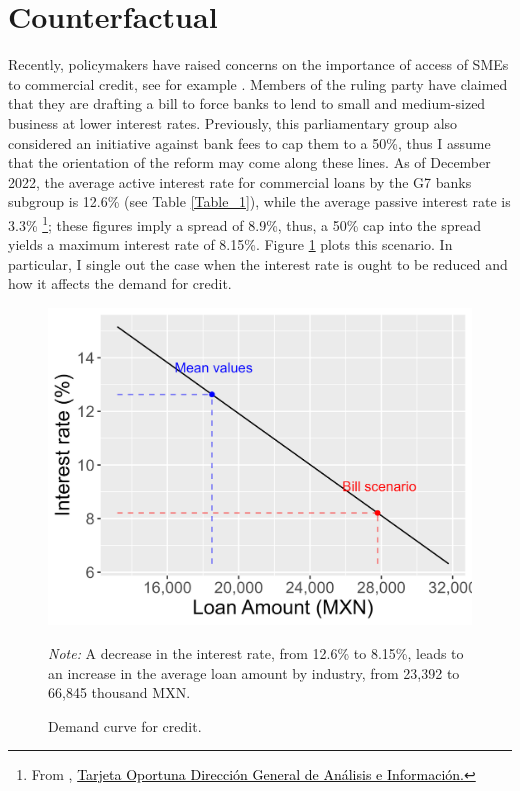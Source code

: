 \documentclass[11pt, oneside]{book}
\let\oldfootnote\footnote %
\renewcommand\footnote[1]{%
\oldfootnote{\hspace{0.05mm}#1}}
\newcommand\fnote[1]{\captionsetup{font=footnotesize}\caption*{#1}}
\begin{document}
\section{Counterfactual}
Recently, policymakers have raised concerns on the importance of access of SMEs to commercial credit, see for example \cite{Haldevang2023intereseschiquitos}. Members of the ruling party have claimed that they are drafting a bill to force banks to lend to small and medium-sized business  at lower interest rates. Previously, this parliamentary group also considered an initiative against bank fees to cap them to a 50\%, thus I assume that  the orientation of the reform may come along these lines. As of December 2022, the average active interest rate for commercial loans by the G7 banks subgroup is 12.6\% (see Table \ref{Table_1}), while the average passive interest rate is 3.3\%\footnote{From  \cite{CNBV2022tarjetaoportuna}, \href{https://portafolioinfo.cnbv.gob.mx/PortafolioInformacion/G7\%20dic21.pdf}{\textcolor{black}{Tarjeta Oportuna Dirección General de Análisis e Información.}}
}; these figures imply a spread of 8.9\%, thus, a 50\% cap into the spread yields a maximum interest rate of 8.15\%.
Figure \ref{Fig_Demand} plots this scenario. In particular, I single out the case when the interest rate is ought to be reduced  and how it affects the demand for credit. 

\begin{figure}[H]
\begin{center}
\includegraphics[scale=.75]{Imagenes/Demand.png}
\caption{Demand curve for credit.}
\fnote{ \textit{Note:} A decrease in the interest rate, from 12.6\% to 8.15\%, leads to an increase in the average loan amount by industry, from 23,392 to 66,845 thousand MXN.}
\label{Fig_Demand}
\end{center}
\end{figure}
\end{document}
